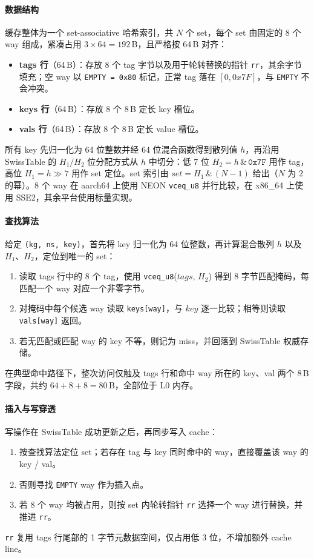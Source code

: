 \documentclass[a4paper,11pt]{article}
\begin{document}
\paragraph{数据结构}
缓存整体为一个 set-associative 哈希索引，共 $N$ 个 set，每个 set 由固定的 8 个 way 组成，紧凑占用 $3 \times 64 = 192$\,B，且严格按 64\,B 对齐：
\begin{itemize}
  \item \textbf{tags 行}（64\,B）：存放 8 个 tag 字节以及用于轮转替换的指针 \texttt{rr}，其余字节填充；空 way 以 \texttt{EMPTY = 0x80} 标记，正常 tag 落在 $[0, 0x7F]$，与 \texttt{EMPTY} 不会冲突。
  \item \textbf{keys 行}（64\,B）：存放 8 个 8\,B 定长 key 槽位。
  \item \textbf{vals 行}（64\,B）：存放 8 个 8\,B 定长 value 槽位。
\end{itemize}
所有 key 先归一化为 64 位整数并经 64 位混合函数得到散列值 $h$，再沿用 SwissTable 的 $H_1/H_2$ 位分配方式从 $h$ 中切分：低 7 位 $H_2 = h \,\&\, \mathtt{0x7F}$ 用作 tag，高位 $H_1 = h \gg 7$ 用作 set 定位。set 索引由 $set = H_1 \,\&\, (N-1)$ 给出（$N$ 为 2 的幂）。8 个 way 在 aarch64 上使用 NEON \texttt{vceq\_u8} 并行比较，在 x86\_64 上使用 SSE2，其余平台使用标量实现。

\paragraph{查找算法}
给定 \texttt{(kg, ns, key)}，首先将 key 归一化为 64 位整数，再计算混合散列 $h$ 以及 $H_1$、$H_2$，定位到唯一的 set：
\begin{enumerate}
  \item 读取 tags 行中的 8 个 tag，使用 \texttt{vceq\_u8}($tags$, $H_2$) 得到 8 字节匹配掩码，每匹配一个 way 对应一个非零字节。
  \item 对掩码中每个候选 way 读取 \texttt{keys[way]}，与 $key$ 逐一比较；相等则读取 \texttt{vals[way]} 返回。
  \item 若无匹配或匹配 way 的 key 不等，则记为 miss，并回落到 SwissTable 权威存储。
\end{enumerate}
在典型命中路径下，整次访问仅触及 tags 行和命中 way 所在的 key、val 两个 8\,B 字段，共约 $64+8+8=80$\,B，全部位于 L0 内存。

\paragraph{插入与写穿透}
写操作在 SwissTable 成功更新之后，再同步写入 cache：
\begin{enumerate}
  \item 按查找算法定位 set；若存在 tag 与 key 同时命中的 way，直接覆盖该 way 的 key / val。
  \item 否则寻找 \texttt{EMPTY} way 作为插入点。
  \item 若 8 个 way 均被占用，则按 set 内轮转指针 \texttt{rr} 选择一个 way 进行替换，并推进 \texttt{rr}。
\end{enumerate}
\texttt{rr} 复用 tags 行尾部的 1 字节元数据空间，仅占用低 3 位，不增加额外 cache line。
\end{document}
